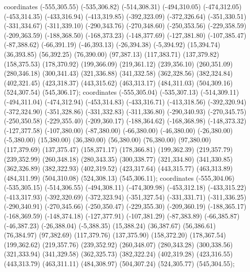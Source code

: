  coordinates {(-555,305.55) (-535,306.82) (-514,308.31) (-494,310.05) (-474,312.05) (-453,314.35) (-433,316.94) (-413,319.85) (-392,323.09) (-372,326.64) (-351,330.51) (-331,334.67) (-311,339.10) (-290,343.76) (-270,348.60) (-250,353.56) (-229,358.59) (-209,363.59) (-188,368.50) (-168,373.23) (-148,377.69) (-127,381.80) (-107,385.47) (-87,388.62) (-66,391.19) (-46,393.13) (-26,394.38) (-5,394.92) (15,394.74) (36,393.85) (56,392.25) (76,390.00) (97,387.13) (117,383.71) (137,379.82) (158,375.53) (178,370.92) (199,366.09) (219,361.12) (239,356.10) (260,351.09) (280,346.18) (300,341.43) (321,336.88) (341,332.58) (362,328.56) (382,324.84) (402,321.45) (423,318.37) (443,315.62) (463,313.17) (484,311.03) (504,309.16) (524,307.54) (545,306.17)};
 coordinates {(-555,305.04) (-535,307.13) (-514,309.11) (-494,311.04) (-474,312.94) (-453,314.83) (-433,316.71) (-413,318.56) (-392,320.94) (-372,324.90) (-351,328.86) (-331,332.83) (-311,336.80) (-290,340.93) (-270,345.75) (-250,350.58) (-229,355.40) (-209,360.17) (-188,364.62) (-168,368.98) (-148,373.32) (-127,377.58) (-107,380.00) (-87,380.00) (-66,380.00) (-46,380.00) (-26,380.00) (-5,380.00) (15,380.00) (36,380.00) (56,380.00) (76,380.00) (97,380.00) (117,379.69) (137,375.47) (158,371.17) (178,366.81) (199,362.39) (219,357.79) (239,352.99) (260,348.18) (280,343.35) (300,338.77) (321,334.80) (341,330.85) (362,326.89) (382,322.93) (402,319.52) (423,317.64) (443,315.77) (463,313.89) (484,311.99) (504,310.08) (524,308.13) (545,306.11)};
 coordinates {(-555,304.06) (-535,305.15) (-514,306.55) (-494,308.11) (-474,309.98) (-453,312.18) (-433,315.22) (-413,317.93) (-392,320.69) (-372,323.94) (-351,327.54) (-331,331.71) (-311,336.25) (-290,340.91) (-270,345.66) (-250,350.47) (-229,355.30) (-209,360.19) (-188,365.17) (-168,369.59) (-148,374.18) (-127,377.91) (-107,381.29) (-87,383.89) (-66,385.87) (-46,387.23) (-26,388.04) (-5,388.35) (15,388.24) (36,387.67) (56,386.61) (76,384.97) (97,382.69) (117,379.76) (137,375.90) (158,372.20) (178,367.54) (199,362.62) (219,357.76) (239,352.92) (260,348.07) (280,343.28) (300,338.56) (321,333.94) (341,329.58) (362,325.73) (382,322.24) (402,319.28) (423,316.55) (443,313.79) (463,311.11) (484,308.97) (504,307.24) (524,305.77) (545,304.55)};
